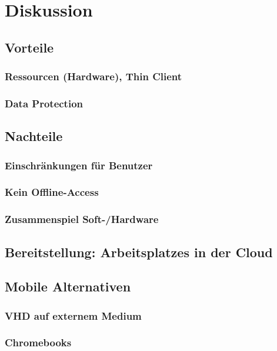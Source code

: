 
\chapter{Diskussion}


\section{Vorteile}

\subsection{Ressourcen (Hardware), Thin Client}

\subsection{Data Protection}

\section{Nachteile}

\subsection{Einschränkungen für Benutzer}
\subsection{Kein Offline-Access}
\subsection{Zusammenspiel Soft-/Hardware}



\section{Bereitstellung: Arbeitsplatzes in der Cloud}



\section{Mobile Alternativen}

\subsection{VHD auf externem Medium}

\subsection{Chromebooks}
